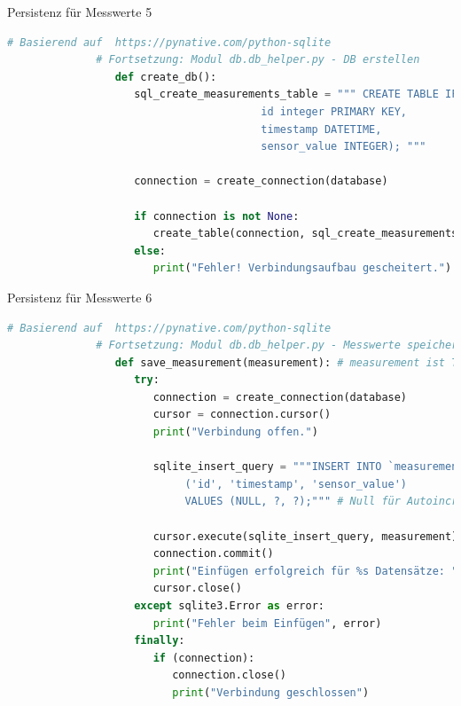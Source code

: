 \begin{frame}[fragile]{Persistenz für Messwerte 5}
       \begin{lstlisting}[language=Python, gobble=8]
              # Basierend auf  https://pynative.com/python-sqlite
              # Fortsetzung: Modul db.db_helper.py - DB erstellen
                 def create_db():
                    sql_create_measurements_table = """ CREATE TABLE IF NOT EXISTS measurements (
                                        id integer PRIMARY KEY,
                                        timestamp DATETIME,
                                        sensor_value INTEGER); """

                    connection = create_connection(database)

                    if connection is not None:
                       create_table(connection, sql_create_measurements_table)
                    else:
                       print("Fehler! Verbindungsaufbau gescheitert.")

        \end{lstlisting}

\end{frame}


\begin{frame}[fragile]{Persistenz für Messwerte 6}
       \begin{lstlisting}[language=Python, gobble=8]
              # Basierend auf  https://pynative.com/python-sqlite
              # Fortsetzung: Modul db.db_helper.py - Messwerte speichern
                 def save_measurement(measurement): # measurement ist Tupel (Zeitstempel, Messwert)
                    try:
                       connection = create_connection(database)
                       cursor = connection.cursor()
                       print("Verbindung offen.")

                       sqlite_insert_query = """INSERT INTO `measurements`
                            ('id', 'timestamp', 'sensor_value')
                            VALUES (NULL, ?, ?);""" # Null für Autoincrement

                       cursor.execute(sqlite_insert_query, measurement)
                       connection.commit()
                       print("Einfügen erfolgreich für %s Datensätze: ", cursor.rowcount)
                       cursor.close()
                    except sqlite3.Error as error:
                       print("Fehler beim Einfügen", error)
                    finally:
                       if (connection):
                          connection.close()
                          print("Verbindung geschlossen")
       \end{lstlisting}

\end{frame}

